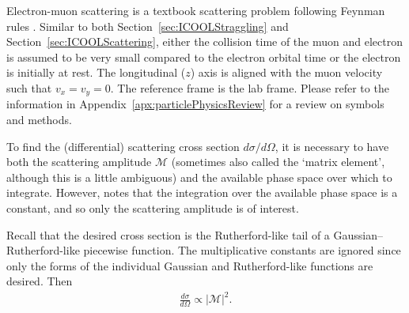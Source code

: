 \label{apx:cosy_cross_section}
 Electron-muon scattering is a textbook scattering problem following Feynman rules \cite{griffithspp}. Similar to both Section~\ref{sec:ICOOLStraggling} and Section~\ref{sec:ICOOLScattering}, either the collision time of the muon and electron is assumed to be very small compared to the electron orbital time or the electron is initially at rest. The longitudinal ($z$) axis is aligned with the muon velocity such that $v_x=v_y=0$. The reference frame is the lab frame. Please refer to the information in Appendix~\ref{apx:particlePhysicsReview} for a review on symbols and methods.

To find the (differential) scattering cross section $d\sigma/d\Omega$, it is necessary to have both the scattering amplitude $\mathcal{M}$ (sometimes also called the `matrix element', although this is a little ambiguous) and the available phase space over which to integrate. However, \cite{griffithspp} notes that the integration over the available phase space is a constant, and so only the scattering amplitude is of interest.

Recall that the desired cross section is the Rutherford-like tail of a Gaussian--Rutherford-like piecewise function. The multiplicative constants are ignored since only the forms of the individual Gaussian and Rutherford-like functions are desired. Then
\begin{align*}
\frac{d\sigma}{d\Omega}\propto |\mathcal{M}|^2.
\end{align*}

